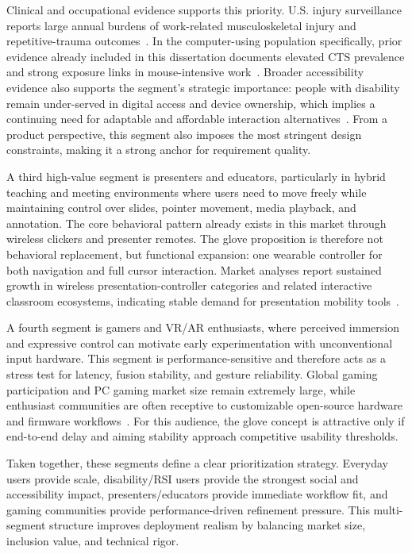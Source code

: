 Clinical and occupational evidence supports this priority. U.S. injury surveillance reports large annual burdens of work-related musculoskeletal injury and repetitive-trauma outcomes~\cite{bls_iif_2024,cdc_ergonomics_2024}. In the computer-using population specifically, prior evidence already included in this dissertation documents elevated CTS prevalence and strong exposure links in mouse-intensive work~\cite{dale2013cts,andersen2003mouse,thomsen2008mouse}. Broader accessibility evidence also supports the segment's strategic importance: people with disability remain under-served in digital access and device ownership, which implies a continuing need for adaptable and affordable interaction alternatives~\cite{perrin2021disabilitytech,duplaga2017disability}. From a product perspective, this segment also imposes the most stringent design constraints, making it a strong anchor for requirement quality.

A third high-value segment is presenters and educators, particularly in hybrid teaching and meeting environments where users need to move freely while maintaining control over slides, pointer movement, media playback, and annotation. The core behavioral pattern already exists in this market through wireless clickers and presenter remotes. The glove proposition is therefore not behavioral replacement, but functional expansion: one wearable controller for both navigation and full cursor interaction. Market analyses report sustained growth in wireless presentation-controller categories and related interactive classroom ecosystems, indicating stable demand for presentation mobility tools~\cite{wiredclicker_market_2024,verifiedmarketreports_clicker_2023}.

A fourth segment is gamers and VR/AR enthusiasts, where perceived immersion and expressive control can motivate early experimentation with unconventional input hardware. This segment is performance-sensitive and therefore acts as a stress test for latency, fusion stability, and gesture reliability. Global gaming participation and PC gaming market size remain extremely large, while enthusiast communities are often receptive to customizable open-source hardware and firmware workflows~\cite{newzoo_gaming_2024,steam_concurrent_2025}. For this audience, the glove concept is attractive only if end-to-end delay and aiming stability approach competitive usability thresholds.

Taken together, these segments define a clear prioritization strategy. Everyday users provide scale, disability/RSI users provide the strongest social and accessibility impact, presenters/educators provide immediate workflow fit, and gaming communities provide performance-driven refinement pressure. This multi-segment structure improves deployment realism by balancing market size, inclusion value, and technical rigor.

